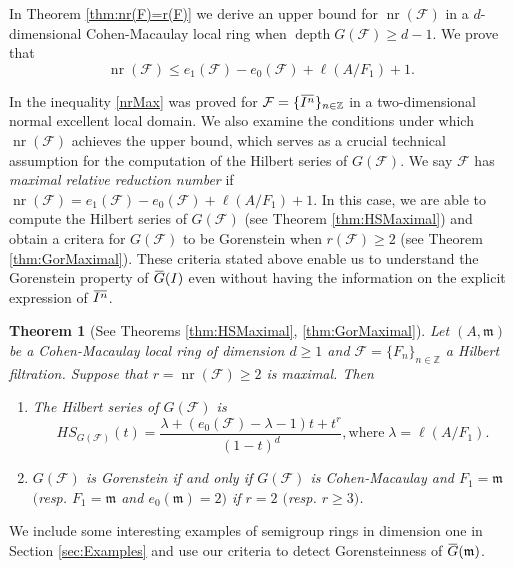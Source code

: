 \documentclass[12pt]{amsart}
\newtheorem{thm}{Theorem}[section]
\theoremstyle{definition}
\theoremstyle{remark}
\numberwithin{equation}{section}
\newcommand{\bbZ}{\ensuremath{\mathbb Z}}
\newcommand{\m}{{\mathfrak m}}
\DeclareMathOperator{\depth}{depth}
\DeclareMathOperator{\nr}{{nr}}
\newcommand{\FF}{\mathcal{F}}
\newcommand{\ol}[1]{\mkern 1.5mu\overline{\mkern-1.5mu#1\mkern-1.5mu}\mkern 1.5mu} %
\begin{document}
\par 
In Theorem \ref{thm:nr(F)=r(F)} 
we derive an upper bound for $\nr(\FF)$ in a $d$-dimensional 
Cohen-Macaulay local ring when $\depth G(\FF) \geq d-1$.
We prove that
\begin{equation}\label{nrMax}  
\nr(\mathcal{F})\leq {e_1}(\mathcal{F})
-e_0(\mathcal{F})+\ell(A/F_1)+1.
\end{equation}
\par 
In \cite{ORWY2022} the inequality \eqref{nrMax} was proved 
for $\FF=\{\ol{I^n}\}_{n \in \mathbb{Z}}$ in a 
two-dimensional normal excellent local domain.
We also examine the conditions under which $\nr(\FF)$ achieves 
the upper bound, which serves as a crucial technical assumption 
for the computation of the Hilbert series of $G(\FF)$.  
We say $\FF$ has {\it maximal relative reduction number}
if $\nr(\FF) = e_1(\FF) -e_0(\FF)+\ell(A/F_1) +1$. 
In this case, we are able to compute the Hilbert series of $G(\FF)$ 
(see Theorem \ref{thm:HSMaximal}) 
and obtain a critera for $G(\FF)$ to be Gorenstein 
when $r(\FF) \ge 2$ (see Theorem \ref{thm:GorMaximal}). 
These criteria stated above enable us to understand 
the Gorenstein property of $\ol{G}(I)$ even without having 
the information on the explicit expression of $\ol{I^n}$. 

\begin{thm}[See Theorems \ref{thm:HSMaximal}, \ref{thm:GorMaximal}] \label{Intro-thm}
Let $(A,\m)$ be a Cohen-Macaulay local ring of dimension $d \ge 1$ 
and $\FF=\{F_n\}_{n \in \bbZ}$ a Hilbert filtration. 
Suppose that $r=\nr(\FF) \ge 2$ is maximal. 
Then 
\begin{enumerate}
\item[(a)] The Hilbert series of $G(\FF)$ is 
\[
HS_{G(\FF)}(t)=\dfrac{\lambda+(e_0(\FF)-\lambda-1)t+t^r}{(1-t)^d}, \text{where}\; \lambda=\ell(A/F_1).  
\]
\item[(b)] $G(\FF)$ is Gorenstein if and only if $G(\FF)$ is Cohen-Macaulay and $F_1=\m$ $($resp. $F_1=\m$ and $e_0(\m)=2$$)$ 
if $r=2$ $($resp. $r \ge 3$$)$. 
\end{enumerate}
\end{thm}

\par 
We include some interesting examples of semigroup rings 
in dimension one in Section \ref{sec:Examples} 
and use our criteria to detect Gorensteinness of $\ol{G}(\m)$. 
\end{document}
